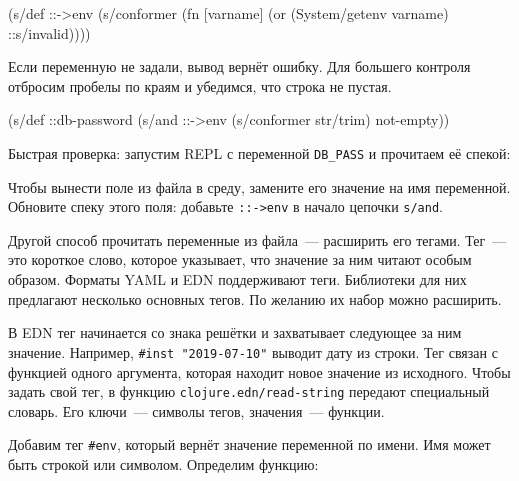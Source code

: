 \else

\begin{english}
  \begin{clojure}
(s/def ::->env
  (s/conformer
   (fn [varname]
     (or (System/getenv varname) ::s/invalid))))
  \end{clojure}
\end{english}

\fi

Если переменную не задали, вывод вернёт ошибку. Для большего контроля
отбросим пробелы по краям и убедимся, что строка не пустая.

\begin{english}
  \begin{clojure}
(s/def ::db-password
  (s/and ::->env
         (s/conformer str/trim)
         not-empty))
  \end{clojure}
\end{english}

Быстрая проверка: запустим REPL с переменной \verb|DB_PASS| и прочитаем её
спекой:

\begin{english}
\end{english}

Чтобы вынести поле из файла в среду, замените его значение на имя
переменной. Обновите спеку этого поля: добавьте \verb|::->env| в начало цепочки
\verb|s/and|.


Другой способ прочитать переменные из файла~--- расширить его тегами. Тег~---
это короткое слово, которое указывает, что значение за ним читают особым
образом. Форматы YAML и EDN поддерживают теги. Библиотеки для них предлагают
несколько основных тегов. По желанию их набор можно расширить.


В EDN тег начинается со знака решётки и захватывает следующее за ним
значение. Например, \verb|#inst "2019-07-10"| выводит дату из строки. Тег связан
с функцией одного аргумента, которая находит новое значение из исходного. Чтобы
задать свой тег, в функцию \verb|clojure.edn/read-string| передают специальный
словарь. Его ключи~--- символы тегов, значения~--- функции.

Добавим тег \verb|#env|, который вернёт значение переменной по имени. Имя
может быть строкой или символом. Определим функцию:

